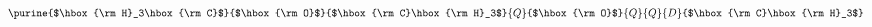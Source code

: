 \initial
{}
\def\H{\hbox{\rm H}}
\def\C{\hbox{\rm C}}
\def\O{\hbox{\rm O}}

\[ \purine{$\H_3\C$}{$\O$}{$\C\H_3$}{Q}{$\O$}{Q}{Q}{D}{$\C\H_3$}  \]
